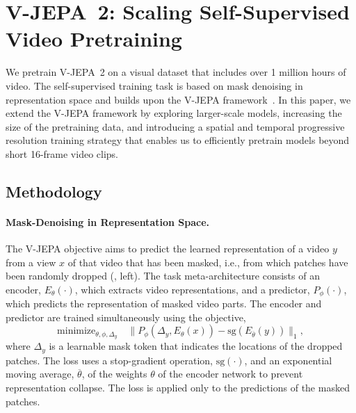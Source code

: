 \documentclass[]{fairmeta}
\newcommand{\model}{V-JEPA~2\xspace}
\begin{document}
\section{V-JEPA~2: Scaling Self-Supervised Video Pretraining}
\label{section:stage1}

We pretrain \model on a visual dataset that includes over 1 million hours of video. The self-supervised training task is based on mask denoising in representation space and builds upon the V-JEPA framework~\citep{bardes2024revisiting}. In this paper, we extend the V-JEPA framework by exploring larger-scale models, increasing the size of the pretraining data, and introducing a spatial and temporal progressive resolution training strategy that enables us to efficiently pretrain models beyond short 16-frame video clips.


\subsection{Methodology}

\paragraph{\bf Mask-Denoising in Representation Space.}
The V-JEPA objective aims to predict the learned representation of a video $y$ from a view $x$ of that video that has been masked, i.e., from which patches have been randomly dropped (, left). The task meta-architecture consists of an encoder, $E_\theta(\cdot)$, which extracts video representations, and a predictor, $P_\phi(\cdot)$, which predicts the representation of masked video parts. The encoder and predictor are trained simultaneously using the objective,
\begin{equation}
\label{eq:loss}
\text{minimize}_{\theta,\phi, \Delta_y}\quad \lVert P_\phi(\Delta_y, E_\theta(x)) - \text{sg}(E_{\overline\theta}(y)) \rVert_1,
\end{equation}
where $\Delta_y$ is a learnable mask token that indicates the locations of the dropped patches. The loss uses a stop-gradient operation, $\text{sg}(\cdot)$, and an exponential moving average, $\overline \theta$, of the weights $\theta$ of the encoder network to prevent representation collapse. The loss is applied only to the predictions of the masked patches.
\end{document}
